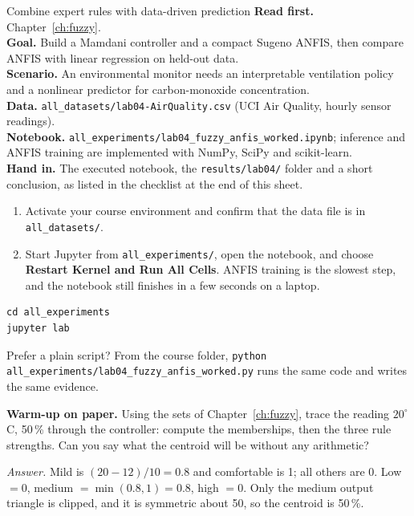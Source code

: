 
\begin{labproject}{Combine expert rules with data-driven prediction}
\textbf{Read first.} Chapter~\ref{ch:fuzzy}.\\
\textbf{Goal.} Build a Mamdani controller and a compact Sugeno ANFIS, then compare ANFIS with linear regression on held-out data.\\
\textbf{Scenario.} An environmental monitor needs an interpretable ventilation policy and a nonlinear predictor for carbon-monoxide concentration.\\
\textbf{Data.} \texttt{all\_datasets/lab04-AirQuality.csv} (UCI Air Quality, hourly sensor readings).\\
\textbf{Notebook.} \texttt{all\_experiments/lab04\_fuzzy\_anfis\_worked.ipynb}; inference and ANFIS training are implemented with NumPy, SciPy and scikit-learn.\\
\textbf{Hand in.} The executed notebook, the \texttt{results/lab04/} folder and a short conclusion, as listed in the checklist at the end of this sheet.
\end{labproject}

\begin{labmode}
\begin{enumerate}
  \item Activate your course environment and confirm that the data file is in \texttt{all\_datasets/}.
  \item Start Jupyter from \texttt{all\_experiments/}, open the notebook, and choose \textbf{Restart Kernel and Run All Cells}. ANFIS training is the slowest step, and the notebook still finishes in a few seconds on a laptop.
\end{enumerate}
\begin{lstlisting}[style=utpterminal]
cd all_experiments
jupyter lab
\end{lstlisting}
Prefer a plain script? From the course folder, \texttt{python all\_experiments/lab04\_fuzzy\_anfis\_worked.py} runs the same code and writes the same evidence.
\end{labmode}



\labroutine

\begin{yourturn}
\textbf{Warm-up on paper.} Using the sets of Chapter~\ref{ch:fuzzy}, trace the reading $20^\circ$C, 50\,\% through the controller: compute the memberships, then the three rule strengths. Can you say what the centroid will be without any arithmetic?

\emph{Answer.} Mild is $(20-12)/10=0.8$ and comfortable is 1; all others are 0. Low $=0$, medium $=\min(0.8,1)=0.8$, high $=0$. Only the medium output triangle is clipped, and it is symmetric about 50, so the centroid is 50\,\%.
\end{yourturn}

